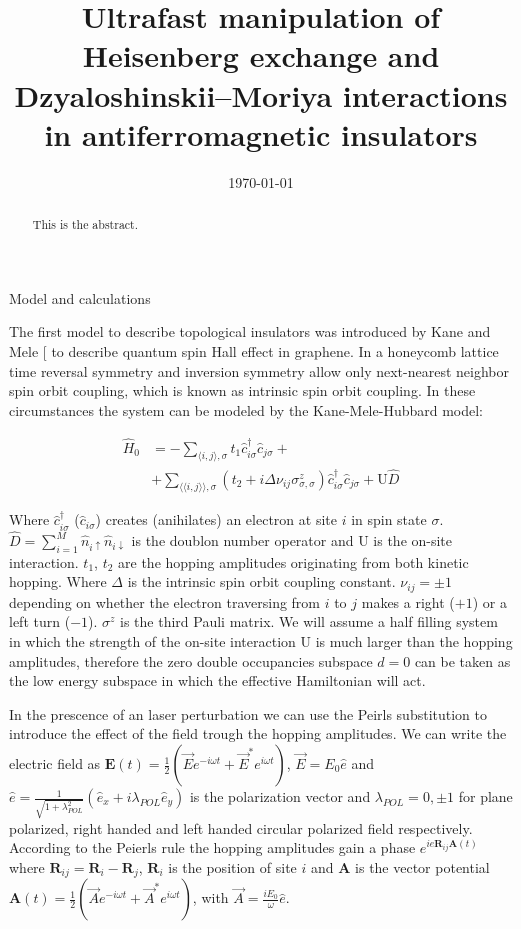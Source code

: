 \documentclass[aps,prl,twocolumn,amsmath,amssymb,superscriptaddress,nobibnotes]{revtex4}%
\renewcommand{\cite}[1]{{[}\onlinecite{#1}{]}}
\newcommand{\n}{\nonumber}
\newcommand{\bs}{\boldsymbol}
\begin{document}
\title{Ultrafast manipulation of Heisenberg exchange and Dzyaloshinskii–Moriya interactions in antiferromagnetic insulators}


\begin{abstract}
This is the abstract.
\end{abstract}

\date{\today}
\maketitle

\begin{section}{Model and calculations}

The first model to describe topological insulators was introduced by Kane and Mele \cite{Kane2005} to describe quantum spin Hall effect in graphene. In a honeycomb lattice time reversal symmetry and inversion symmetry allow only next-nearest neighbor spin orbit coupling, which is known as intrinsic spin orbit coupling. In these circumstances the system can be modeled by the Kane-Mele-Hubbard model:

\begin{align}
\label{MKMH}
\hat{H}_0 &= - \sum_{\langle i,j \rangle, \sigma} t_1\hat{c}_{i \sigma}^\dagger \hat{c}_{j \sigma} + \n \\
	&+\sum_{\langle \langle i,j \rangle \rangle, \sigma}(t_2 + i\Delta\nu_{ij}\sigma^z_{\sigma, \sigma})\hat{c}_{i \sigma}^\dagger \hat{c}_{j \sigma} + 
	\text{U}\hat{D}
\end{align}

Where $\hat{c}_{i \sigma}^\dagger$ ($ \hat{c}_{i \sigma}$) creates (anihilates) an electron at site $i$ in spin state $\sigma$. $\hat{D} = \sum_{i=1}^M \hat{n}_{i\uparrow}\hat{n}_{i\downarrow}$ is the doublon number operator and $\text{U}$ is the on-site interaction. $t_1$, $t_2$ are the hopping amplitudes originating from both kinetic hopping. Where $\Delta$ is the intrinsic spin orbit coupling constant. $\nu_{ij}=\pm 1$ depending on whether the electron traversing from $i$ to $j$ makes a right ($+1$) or a left turn ($-1$). $\sigma^{z}$ is the third Pauli matrix. We will assume a half filling system in which the strength of the on-site interaction $\text{U}$ is much larger than the hopping amplitudes, therefore the zero double occupancies subspace $d=0$ can be taken as the low energy subspace in which the effective Hamiltonian will act.

In the prescence of an laser perturbation we can use the Peirls substitution to introduce the effect of the field trough the hopping amplitudes. We can write the electric field as $\bs{E}(t) = \frac{1}{2}(\vec{E}e^{-i\omega t}+\vec{E}^*e^{i\omega t})$, $\vec{E} = E_0\hat{e}$ and $\hat{e} = \frac{1}{\sqrt{1+\lambda_{POL}^2}}(\hat{e}_x+i\lambda_{POL}\hat{e}_y)$ is the polarization vector and $\lambda_{POL} = 0, \pm 1$ for plane polarized, right handed and left handed circular polarized field respectively. According to the Peierls rule the hopping amplitudes gain a phase $e^{ie\bs{R}_{ij}\bs{A}(t)}$ where $\bs{R}_{ij} = \bs{R}_i-\bs{R}_j$, $\bs{R}_i$ is the position of site $i$ and $\bs{A}$ is the vector potential $\bs{A}(t) = \frac{1}{2}(\vec{A}e^{-i\omega t} + \vec{A}^* e^{i\omega t})$, with $\vec{A} = \frac{iE_0}{\omega}\hat{e}$.


\end{section}
\end{document}
